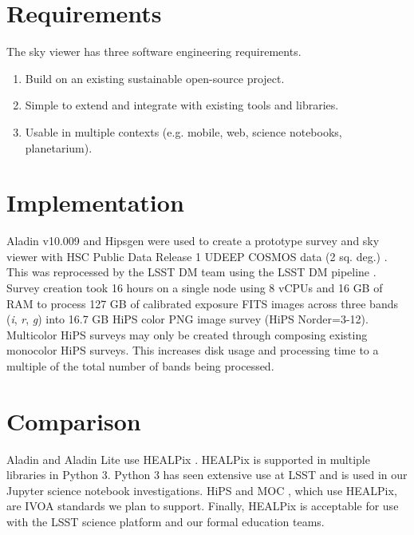 \documentclass[11pt,twoside]{article}
\begin{document}

\section{Requirements}
The sky viewer has three software engineering requirements.
\begin{enumerate}
\item Build on an existing sustainable open-source project.
\item Simple to extend and integrate with existing tools and libraries.
\item Usable in multiple contexts (e.g. mobile, web, science notebooks, planetarium).
\end{enumerate}

\section{Implementation}
Aladin v10.009 and Hipsgen were used to create a prototype survey and sky viewer with HSC Public Data Release 1 UDEEP COSMOS data (2 sq. deg.) \citep{2017arXiv170208449A}. This was reprocessed by the LSST DM team using the LSST DM pipeline \citep{2015arXiv151207914J}. Survey creation took 16 hours on a single node using 8 vCPUs and 16 GB of RAM to process 127 GB of calibrated exposure FITS images across three bands (\emph{i}, \emph{r}, \emph{g}) into 16.7 GB HiPS \citep{2015A&A...578A.114F} color PNG image survey (HiPS Norder=3-12). Multicolor HiPS surveys may only be created through composing existing monocolor HiPS surveys. This increases disk usage and processing time to a multiple of the total number of bands being processed.
\section{Comparison}
Aladin and Aladin Lite use HEALPix \citep{2007MNRAS.381..865C}. HEALPix is supported in multiple libraries in Python 3. Python 3 has seen extensive use at LSST \citep{P1-123_adassxxvii} and is used in our Jupyter \citep{PER-GRA:2007} science notebook investigations. HiPS and MOC \citep{2015A&A...578A.114F}, which use HEALPix, are IVOA standards we plan to support. Finally, HEALPix is acceptable for use with the LSST science platform \citep{2017LSST.1.LDM-542} and our formal education teams.
\end{document}
